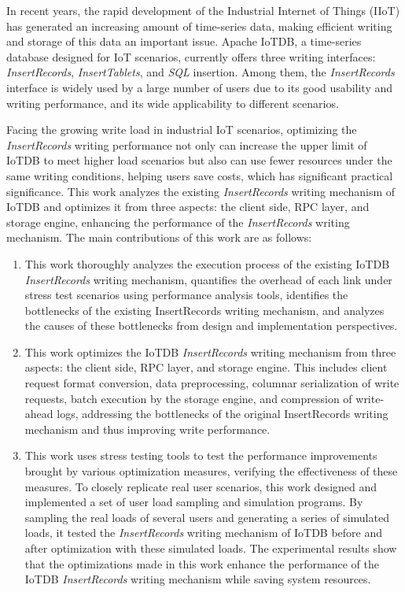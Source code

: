 \begin{abstract*}

In recent years, the rapid development of the Industrial Internet of Things (IIoT) has generated an increasing amount of time-series data, making efficient writing and storage of this data an important issue. Apache IoTDB, a time-series database designed for IoT scenarios, currently offers three writing interfaces: \emph{InsertRecords}, \emph{InsertTablets}, and \emph{SQL} insertion. Among them, the \emph{InsertRecords} interface is widely used by a large number of users due to its good usability and writing performance, and its wide applicability to different scenarios.

Facing the growing write load in industrial IoT scenarios, optimizing the \emph{InsertRecords} writing performance not only can increase the upper limit of IoTDB to meet higher load scenarios but also can use fewer resources under the same writing conditions, helping users save costs, which has significant practical significance. This work analyzes the existing \emph{InsertRecords} writing mechanism of IoTDB and optimizes it from three aspects: the client side, RPC layer, and storage engine, enhancing the performance of the \emph{InsertRecords} writing mechanism. The main contributions of this work are as follows:
\begin{enumerate}
  \item This work thoroughly analyzes the execution process of the existing IoTDB \emph{InsertRecords} writing mechanism, quantifies the overhead of each link under stress test scenarios using performance analysis tools, identifies the bottlenecks of the existing InsertRecords writing mechanism, and analyzes the causes of these bottlenecks from design and implementation perspectives.
  \item This work optimizes the IoTDB \emph{InsertRecords} writing mechanism from three aspects: the client side, RPC layer, and storage engine. This includes client request format conversion, data preprocessing, columnar serialization of write requests, batch execution by the storage engine, and compression of write-ahead logs, addressing the bottlenecks of the original InsertRecords writing mechanism and thus improving write performance.
  \item This work uses stress testing tools to test the performance improvements brought by various optimization measures, verifying the effectiveness of these measures. To closely replicate real user scenarios, this work designed and implemented a set of user load sampling and simulation programs. By sampling the real loads of several users and generating a series of simulated loads, it tested the \emph{InsertRecords} writing mechanism of IoTDB before and after optimization with these simulated loads. The experimental results show that the optimizations made in this work enhance the performance of the IoTDB \emph{InsertRecords} writing mechanism while saving system resources.
\end{enumerate}
\end{abstract*}
